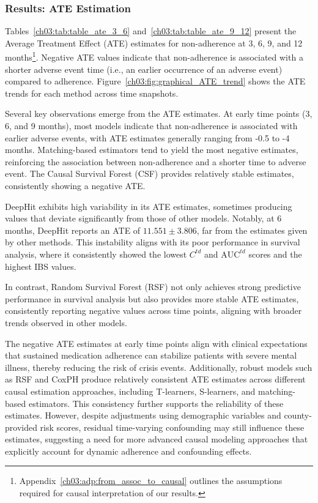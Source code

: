 \subsubsection{Results: ATE Estimation}
\label{ch03:sec:04_results_causal}

Tables~\ref{ch03:tab:table_ate_3_6} and~\ref{ch03:tab:table_ate_9_12} present the Average Treatment Effect (ATE) estimates for non-adherence at 3, 6, 9, and 12 months\footnote{Appendix~\ref{ch03:adp:from_assoc_to_causal} outlines the assumptions required for causal interpretation of our results.}.
Negative ATE values indicate that non-adherence is associated with a shorter adverse event time (i.e., an earlier occurrence of an adverse event) compared to adherence.
Figure~\ref{ch03:fig:graphical_ATE_trend} shows the ATE trends for each method across time snapshots.

Several key observations emerge from the ATE estimates. 
At early time points (3, 6, and 9 months), most models indicate that non-adherence is associated with earlier adverse events, with ATE estimates generally ranging from -0.5 to -4 months. 
Matching-based estimators tend to yield the most negative estimates, reinforcing the association between non-adherence and a shorter time to adverse event. 
The Causal Survival Forest (CSF) provides relatively stable estimates, consistently showing a negative ATE.

DeepHit exhibits high variability in its ATE estimates, sometimes producing values that deviate significantly from those of other models. 
Notably, at 6 months, DeepHit reports an ATE of \(11.551 \pm 3.806\), far from the estimates given by other methods. 
This instability aligns with its poor performance in survival analysis, where it consistently showed the lowest \(C^{td}\) and \(\text{AUC}^{td}\) scores and the highest IBS values.

In contrast, Random Survival Forest (RSF) not only achieves strong predictive performance in survival analysis but also provides more stable ATE estimates, consistently reporting negative values across time points, aligning with broader trends observed in other models. 

The negative ATE estimates at early time points align with clinical expectations that sustained medication adherence can stabilize patients with severe mental illness, thereby reducing the risk of crisis events.
Additionally, robust models such as RSF and CoxPH produce relatively consistent ATE estimates across different causal estimation approaches, including T-learners, S-learners, and matching-based estimators.
This consistency further supports the reliability of these estimates.
However, despite adjustments using demographic variables and county-provided risk scores, residual time-varying confounding may still influence these estimates, suggesting a need for more advanced causal modeling approaches that explicitly account for dynamic adherence and confounding effects.


